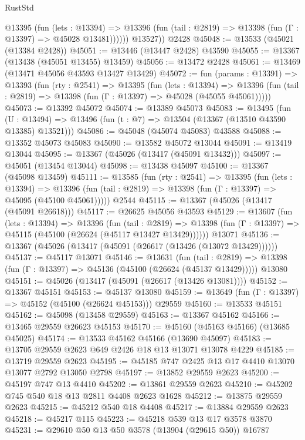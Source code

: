 \begin{lexlean}{RustStd}
\begin{coremodule}
            @13395
              (fun (lets : @13394) =>
              @13396 (fun (tail : @2819) => @13398 (fun (Γ : @13397) => @45028 @13481))))))
        @13527))
    @2428
@45048 := @13533 (@45021 (@13384 @2428))
@45051 := @13446 (@13447 @2428) @43590
@45055 := @13367 (@13438 (@45051 @13455) @13459)
@45056 := @13472 @2428
@45061 := @13469 (@13471 @45056 @43593 @13427 @13429)
@45072 := fun (params : @13391) =>
  @13393
    (fun (rty : @2541) =>
    @13395
      (fun (lets : @13394) =>
      @13396 (fun (tail : @2819) => @13398 (fun (Γ : @13397) => @45028 (@45055 @45061)))))
@45073 := @13392 @45072
@45074 := @13389 @45073
@45083 := @13495
    (fun (U : @13494) => @13496 (fun (t : @7) => @13504 (@13367 (@13510 @43590 @13385) @13521)))
@45086 := @45048 (@45074 @45083) @43588
@45088 := @13352 @45073 @45083
@45090 := @13582 @45072 @13044
@45091 := @13419 @13044
@45095 := @13367 (@45026 (@13417 (@45091 @13432)))
@45097 := @45051 (@13454 @13044)
@45098 := @13438 @45097
@45100 := @13367 (@45098 @13459)
@45111 := @13585
    (fun (rty : @2541) =>
    @13395
      (fun (lets : @13394) =>
      @13396 (fun (tail : @2819) => @13398 (fun (Γ : @13397) => @45095 (@45100 @45061)))))
    @2544
@45115 := @13367 (@45026 (@13417 (@45091 @26618)))
@45117 := @26625 @45056 @43593
@45129 := @13607
    (fun (lets : @13394) =>
    @13396
      (fun (tail : @2819) =>
      @13398 (fun (Γ : @13397) => @45115 (@45100 (@26624 (@45117 @13427 @13429))))))
    @13071
@45136 := @13367 (@45026 (@13417 (@45091 (@26617 (@13426 (@13072 @13429))))))
@45137 := @45117 @13071
@45146 := @13631
    (fun (tail : @2819) => @13398 (fun (Γ : @13397) => @45136 (@45100 (@26624 (@45137 @13429)))))
    @13080
@45151 := @45026 (@13417 (@45091 (@26617 (@13426 @13081))))
@45152 := @13367 @45151
@45153 := @45137 @13080
@45159 := @13649 (fun (Γ : @13397) => @45152 (@45100 (@26624 @45153))) @29559
@45160 := @13533 @45151
@45162 := @45098 (@13458 @29559)
@45163 := @13367 @45162
@45166 := @13465 @29559 @26623 @45153
@45170 := @45160 (@45163 @45166) (@13685 @45025)
@45174 := @13533 @45162 @45166 (@13690 @45097)
@45183 := @13705 @29559 @2623 @649 @2426 @18 @13 @13071 @13078 @4229
@45185 := @13719 @29559 @2623
@45195 := @45185 @747 @2425 @13 @17 @4410 @13070 @13077 @2792 @13050 @2798
@45197 := @13852 @29559 @2623
@45200 := @45197 @747 @13 @4410
@45202 := @13861 @29559 @2623
@45210 := @45202 @745 @540 @18 @13 @2811 @4408 @2623 @1628
@45212 := @13875 @29559 @2623
@45215 := @45212 @540 @18 @4408
@45217 := @13884 @29559 @2623
@45218 := @45217 @115
@45223 := @45218 @539 @13 @17 @3578 @3870
@45231 := @29610 @50 @13 @50 @3578 (@13904 (@29615 @50)) @16787

\end{coremodule}
\end{lexlean}
